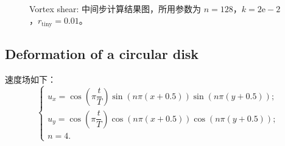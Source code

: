 \documentclass[a4paper,twoside]{ctexart}
\begin{document}
\begin{figure}[H]
{    }\\
    \caption{Vortex shear: 中间步计算结果图，所用参数为 $n=128$，$k=2\mathrm{e}-2$，$r_\mathrm{tiny}=0.01$。}
    \label{fig:vortex}
\end{figure}

\subsection{Deformation of a circular disk}

速度场如下：
\begin{equation}
  \left\{
    \begin{array}{l}
      u_x=\cos\left(\pi \dfrac{t}{T}\right)\sin(n\pi(x+0.5))\sin(n\pi(y+0.5));\\
      u_y=\cos\left(\pi \dfrac{t}{T}\right)\cos(n\pi(x+0.5))\cos(n\pi(y+0.5));\\
      n=4.
    \end{array}
  \right.
\end{equation}
\end{document}
